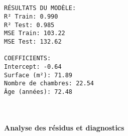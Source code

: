 \documentclass[11pt]{article}
\begin{document}
    \begin{center}
    \end{center}
    { \hspace*{\fill} \\}
    
    \begin{Verbatim}[commandchars=\\\{\}]

RÉSULTATS DU MODÈLE:
R² Train: 0.990
R² Test: 0.985
MSE Train: 103.22
MSE Test: 132.62

COEFFICIENTS:
Intercept: -0.64
Surface (m²): 71.89
Nombre de chambres: 22.54
Âge (années): 72.48
    \end{Verbatim}

    \begin{center}
    \end{center}
    { \hspace*{\fill} \\}
    
    \paragraph{Analyse des résidus et
diagnostics}\label{analyse-des-ruxe9sidus-et-diagnostics}
\end{document}
